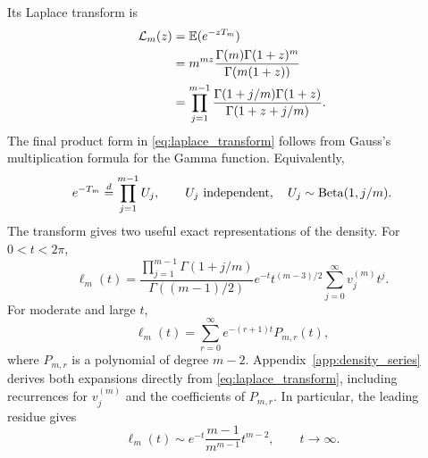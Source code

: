 \documentclass[11pt]{article}
\theoremstyle{remark}
\newcommand{\E}{\mathbb E}
\newcommand{\Bet}{\operatorname{Beta}}
\begin{document}
Its Laplace transform is
\begin{align}
 \mathcal L_m(z)
 &=\E(e^{-zT_m}) \notag\\
 &=m^{mz}\frac{\Gamma(m)\Gamma(1+z)^m}{\Gamma(m(1+z))} \notag\\
 &=\prod_{j=1}^{m-1}
   \frac{\Gamma(1+j/m)\Gamma(1+z)}{\Gamma(1+z+j/m)}.
 \label{eq:laplace_transform}
\end{align}
The final product form in \eqref{eq:laplace_transform} follows from Gauss's multiplication formula for the Gamma function. Equivalently,
\begin{equation}
 e^{-T_m}\overset d=\prod_{j=1}^{m-1}U_j,
 \qquad
 U_j\ \hbox{independent},\quad U_j\sim\Bet(1,j/m).
 \label{eq:beta_product}
\end{equation}
The transform gives two useful exact representations of the density. For $0<t<2\pi$,
\begin{equation}
 \ell_m(t)=
 \frac{\displaystyle\prod_{j=1}^{m-1}\Gamma(1+j/m)}
      {\Gamma((m-1)/2)}
 e^{-t}t^{(m-3)/2}
 \sum_{j=0}^{\infty}v_j^{(m)}t^j.
 \label{eq:glaser_series}
\end{equation}
For moderate and large $t$,
\begin{equation}
 \ell_m(t)=\sum_{r=0}^{\infty}e^{-(r+1)t}P_{m,r}(t),
 \label{eq:residue_series}
\end{equation}
where $P_{m,r}$ is a polynomial of degree $m-2$. Appendix~\ref{app:density_series} derives both expansions directly from \eqref{eq:laplace_transform}, including recurrences for $v_j^{(m)}$ and the coefficients of $P_{m,r}$. In particular, the leading residue gives
\begin{equation}
 \ell_m(t)\sim e^{-t}\frac{m-1}{m^{m-1}}t^{m-2},
 \qquad t\to\infty.
 \label{eq:ell_tail}
\end{equation}
\end{document}
